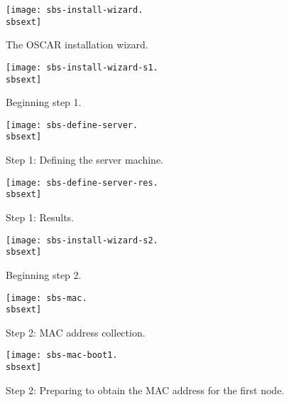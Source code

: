 \begin{figure}[htbp]
  \begin{center}
    \texttt{[image: sbs-install-wizard.\\sbsext]}
    \caption{The OSCAR installation wizard.}
    \label{fig:sbs-install-wizard}
  \end{center}
\end{figure}

\begin{figure}[htbp]
  \begin{center}
    \texttt{[image: sbs-install-wizard-s1.\\sbsext]}
    \caption{Beginning step 1.}
    \label{fig:sbs-install-wizard-s1}
  \end{center}
\end{figure}

\begin{figure}[htbp]
  \begin{center}
    \texttt{[image: sbs-define-server.\\sbsext]}
    \caption{Step 1: Defining the server machine.}
    \label{fig:sbs-define-server}
  \end{center}
\end{figure}

\begin{figure}[htbp]
  \begin{center}
    \texttt{[image: sbs-define-server-res.\\sbsext]}
    \caption{Step 1: Results.}
    \label{fig:sbs-define-server-res}
  \end{center}
\end{figure}

\begin{figure}[htbp]
  \begin{center}
    \texttt{[image: sbs-install-wizard-s2.\\sbsext]}
    \caption{Beginning step 2.}
    \label{fig:sbs-install-wizard-s2}
  \end{center}
\end{figure}

\begin{figure}[htbp]
  \begin{center}
    \texttt{[image: sbs-mac.\\sbsext]}
    \caption{Step 2: MAC address collection.}
    \label{fig:sbs-mac}
  \end{center}
\end{figure}

\begin{figure}[htbp]
  \begin{center}
    \texttt{[image: sbs-mac-boot1.\\sbsext]}
    \caption{Step 2: Preparing to obtain the MAC address for the first node.}
    \label{fig:sbs-mac-boot1}
  \end{center}
\end{figure}

